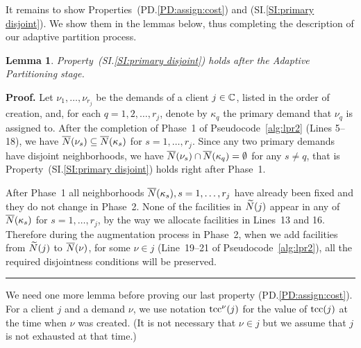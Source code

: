 \documentclass[oneside,final]{ucr}
\newtheorem{lemma}[theorem]{Lemma}
\newenvironment{proof}[1][Proof]{\textbf{#1.} }{\ \rule{0.5em}{0.5em}}
\begin{document}
It remains to show Properties~(PD.\ref{PD:assign:cost}) and
(SI.\ref{SI:primary disjoint}). We show them in the lemmas
below, thus completing the description of our adaptive
partition process.


\begin{lemma}\label{lem: property SI:primary disjoint holds}
  Property~(SI.\ref{SI:primary disjoint}) holds after the
  Adaptive Partitioning stage.
\end{lemma}
\begin{proof}
  Let $\nu_1,\ldots,\nu_{r_j}$ be the demands of a client
  $j\in\mathbb{C}$, listed in the order of creation, and, for each
  $q=1,2,\ldots,r_j$, denote by $\kappa_q$ the primary demand that
  $\nu_q$ is assigned to. After the completion of Phase~1 of
  Pseudocode~\ref{alg:lpr2} (Lines 5--18), we have
  ${\overline{N}}(\nu_s)\subseteq {\overline{N}}(\kappa_s)$ for  $s=1,\ldots,r_j$. 
Since any two primary demands have disjoint
  neighborhoods, we have ${\overline{N}}(\nu_s) \cap {\overline{N}}(\kappa_q) =
  \emptyset$ for any $s\neq q$, that is
	Property~(SI.\ref{SI:primary disjoint}) holds right after Phase~1.

        After Phase~1 all neighborhoods ${\overline{N}}(\kappa_s),
        s=1,\ldots,r_j$ have already been fixed and they do not change
        in Phase~2.  None of the facilities in ${\widetilde N}(j)$ appear in
        any of ${\overline{N}}(\kappa_s)$ for $s=1,\ldots,r_j$, by the way we
        allocate facilities in Lines~13 and 16.  Therefore during the
        augmentation process in Phase~2, when we add facilities from
        ${\widetilde N}(j)$ to ${\overline{N}}(\nu)$, for some $\nu\in j$
        (Line~19--21 of Pseudocode~\ref{alg:lpr2}), all the required
        disjointness conditions will be preserved.
\end{proof}


We need one more lemma before proving our last property
(PD.\ref{PD:assign:cost}).  For a client $j$ and a demand
$\nu$, we use notation $\mbox{\rm{tcc}}^{\nu}(j)$ for the value of
$\mbox{\rm{tcc}}(j)$ at the time when $\nu$ was created. (It is not
necessary that $\nu\in j$ but we assume that $j$ is not
exhausted at that time.)
\end{document}
